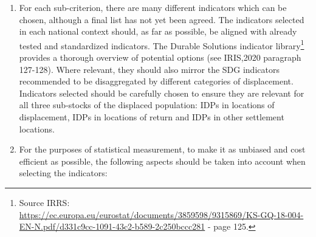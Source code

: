 \documentclass[
]{article}
\begin{document}
\begin{enumerate}
\def\labelenumi{\arabic{enumi}.}
\setcounter{enumi}{83}
\item
  For each sub-criterion, there are many different indicators which
  can be chosen, although a final list has not yet been agreed. The
  indicators selected in each national context should, as far as
  possible, be aligned with already tested and standardized
  indicators. The Durable Solutions indicator library\footnote{Source IRRS:
    \url{https://ec.europa.eu/eurostat/documents/3859598/9315869/KS-GQ-18-004-EN-N.pdf/d331c9cc-1091-43c2-b589-2c250bccc281}
    - page 125.} provides a
  thorough overview of potential options (see IRIS,2020 paragraph
  127-128). Where relevant, they should also mirror the SDG indicators
  recommended to be disaggregated by different categories of
  displacement. Indicators selected should be carefully chosen to
  ensure they are relevant for all three sub-stocks of the displaced
  population: IDPs in locations of displacement, IDPs in locations of
  return and IDPs in other settlement locations.
\item
  For the purposes of statistical measurement, to make it as unbiased
  and cost efficient as possible, the following aspects should be
  taken into account when selecting the indicators:


\end{enumerate}
\end{document}
